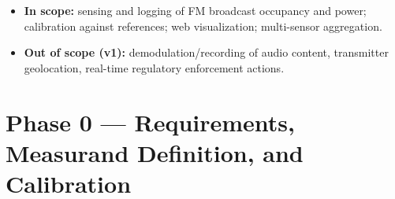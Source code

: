 \documentclass[12pt,a4paper]{report}
\begin{document}
 \begin{itemize}
 	\item \textbf{In scope:} sensing and logging of FM broadcast occupancy and
 	power; calibration against references; web visualization; multi-sensor
 	aggregation.
 	\item \textbf{Out of scope (v1):} demodulation/recording of audio content,
 	transmitter geolocation, real-time regulatory enforcement actions.
 \end{itemize}
 \section{Phase 0 --- Requirements, Measurand Definition, and Calibration}
 \label{sec:phase0}
\end{document}
